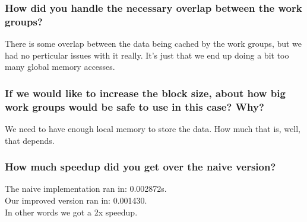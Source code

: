 \documentclass[a4paper,12pt]{article}
\begin{document}
\subsubsection{How did you handle the necessary overlap between the work groups?}

There is some overlap between the data being cached by the work groups, but we had no perticular issues with it really. It's just that we end up doing a bit too many global memory accesses.


\subsubsection{If we would like to increase the block size, about how big work groups would be safe to use in this case? Why?}

We need to have enough local memory to store the data. How much that is, well, that depends.


\subsubsection{How much speedup did you get over the naive version?}

The naive implementation ran in: 0.002872s.\\
\noindent
Our improved version ran in: 0.001430.\\
\noindent
In other words we got a 2x speedup.
\end{document}
